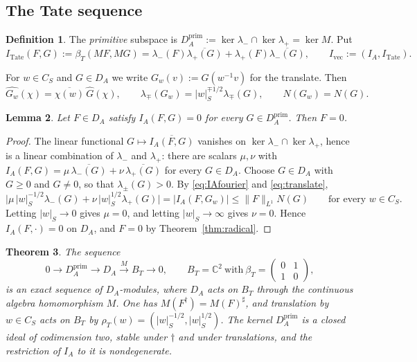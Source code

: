 \documentclass[11pt]{amsart}
\newtheorem{theorem}{Theorem}[section]
\newtheorem{lemma}[theorem]{Lemma}
\theoremstyle{definition}
\newtheorem{definition}[theorem]{Definition}
\theoremstyle{remark}
\newcommand{\C}{\mathbb C}
\newcommand{\DA}{D_A}
\newcommand{\BT}{B_T}
\begin{document}
\subsection{The Tate sequence}

\begin{definition}\label{def:prim}
The \emph{primitive} subspace is
$\DA^{\mathrm{prim}}:=\ker\lambda_-\cap\ker\lambda_+=\ker M$.  Put
\[
I_{\mathrm{Tate}}(F,G):=\beta_T(MF,MG)=\lambda_-(F)\overline{\lambda_+(G)}
+\lambda_+(F)\overline{\lambda_-(G)},\qquad
I_{\mathrm{vec}}:=(I_A,I_{\mathrm{Tate}}).
\]
\end{definition}

For $w\in C_S$ and $G\in\DA$ we write $G_w(v):=G(w^{-1}v)$ for the translate.
Then
\begin{equation}\label{eq:translate}
\widehat{G_w}(\chi)=\overline{\chi(w)}\,\widehat G(\chi),\qquad
\lambda_{\mp}(G_w)=|w|_S^{\mp1/2}\lambda_{\mp}(G),\qquad N(G_w)=N(G).
\end{equation}

\begin{lemma}\label{lem:orthprim}
Let $F\in\DA$ satisfy $I_A(F,G)=0$ for every $G\in\DA^{\mathrm{prim}}$.  Then
$F=0$.
\end{lemma}

\begin{proof}
The linear functional $G\mapsto\overline{I_A(F,G)}$ vanishes on
$\ker\lambda_-\cap\ker\lambda_+$, hence is a linear combination of $\lambda_-$
and $\lambda_+$: there are scalars $\mu,\nu$ with
$I_A(F,G)=\mu\,\overline{\lambda_-(G)}+\nu\,\overline{\lambda_+(G)}$ for every
$G\in\DA$.  Choose $G\in\DA$ with $G\ge0$ and $G\ne0$, so that
$\lambda_{\pm}(G)>0$.  By \eqref{eq:IAfourier} and \eqref{eq:translate},
\[
\bigl|\mu\,|w|_S^{-1/2}\lambda_-(G)+\nu\,|w|_S^{1/2}\lambda_+(G)\bigr|
=|I_A(F,G_w)|\le\lVert F\rVert_{L^{1}}N(G)
\qquad\text{for every }w\in C_S .
\]
Letting $|w|_S\to0$ gives $\mu=0$, and letting $|w|_S\to\infty$ gives $\nu=0$.
Hence $I_A(F,\cdot)=0$ on $\DA$, and $F=0$ by Theorem~\ref{thm:radical}.
\end{proof}

\begin{theorem}\label{thm:tateseq}
The sequence
\begin{equation}\label{eq:tateseq}
0\longrightarrow \DA^{\mathrm{prim}}\longrightarrow\DA
\stackrel{M}{\longrightarrow}\BT\longrightarrow 0,\qquad
\BT=\C^{2}\ \text{with}\
\beta_T=\begin{pmatrix}0&1\\1&0\end{pmatrix},
\end{equation}
is an exact sequence of $\DA$-modules, where $\DA$ acts on $\BT$ through the
continuous algebra homomorphism $M$.  One has $M(F^{\dagger})=M(F)^{\sharp}$,
and translation by $w\in C_S$ acts on $\BT$ by
$\rho_T(w)=(|w|_S^{-1/2},|w|_S^{1/2})$.  The kernel $\DA^{\mathrm{prim}}$ is a
closed ideal of codimension two, stable under $\dagger$ and under
translations, and the restriction of $I_A$ to it is nondegenerate.
\end{theorem}
\end{document}
